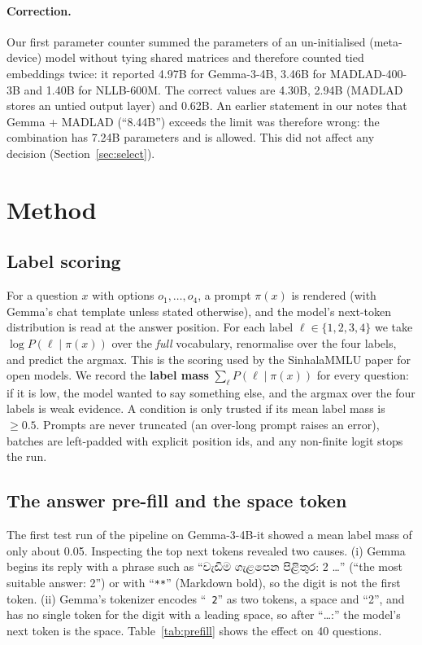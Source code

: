 \documentclass[10pt,a4paper]{article}
\newcommand{\si}[1]{{\sinhalafont #1}}
\begin{document}
\paragraph{Correction.} Our first parameter counter summed the parameters of an un-initialised (meta-device)
model without tying shared matrices and therefore counted tied embeddings twice: it reported 4.97B for Gemma-3-4B,
3.46B for MADLAD-400-3B and 1.40B for NLLB-600M. The correct values are 4.30B, 2.94B (MADLAD stores an untied
output layer) and 0.62B. An earlier statement in our notes that Gemma + MADLAD (``8.44B'') exceeds the limit was
therefore wrong: the combination has 7.24B parameters and is allowed. This did not affect any decision
(Section~\ref{sec:select}).

\section{Method}\label{sec:method}
\subsection{Label scoring}
For a question $x$ with options $o_1,\dots,o_4$, a prompt $\pi(x)$ is rendered (with Gemma's chat template unless
stated otherwise), and the model's next-token distribution is read at the answer position. For each label
$\ell\in\{1,2,3,4\}$ we take $\log P(\ell \mid \pi(x))$ over the \emph{full} vocabulary, renormalise over the four labels,
and predict the argmax. This is the scoring used by the SinhalaMMLU paper for open models. We record the
\textbf{label mass} $\sum_\ell P(\ell\mid\pi(x))$ for every question: if it is low, the model wanted to say
something else, and the argmax over the four labels is weak evidence. A condition is only trusted if its mean label
mass is $\ge 0.5$. Prompts are never truncated (an over-long prompt raises an error), batches are left-padded with
explicit position ids, and any non-finite logit stops the run.

\subsection{The answer pre-fill and the space token}\label{sec:prefill}
The first test run of the pipeline on Gemma-3-4B-it showed a mean label mass of only about 0.05. Inspecting the
top next tokens revealed two causes. (i) Gemma begins its reply with a phrase such as
``\si{වැඩිම ගැළපෙන පිළිතුර}: 2 \ldots'' (``the most suitable answer: 2'') or with ``\texttt{**}'' (Markdown bold), so
the digit is not the first token. (ii) Gemma's tokenizer encodes ``\verb*| 2|'' as two tokens, a space and ``2'',
and has no single token for the digit with a leading space, so after ``\ldots:'' the model's next token is the space.
Table~\ref{tab:prefill} shows the effect on 40 questions.
\end{document}
